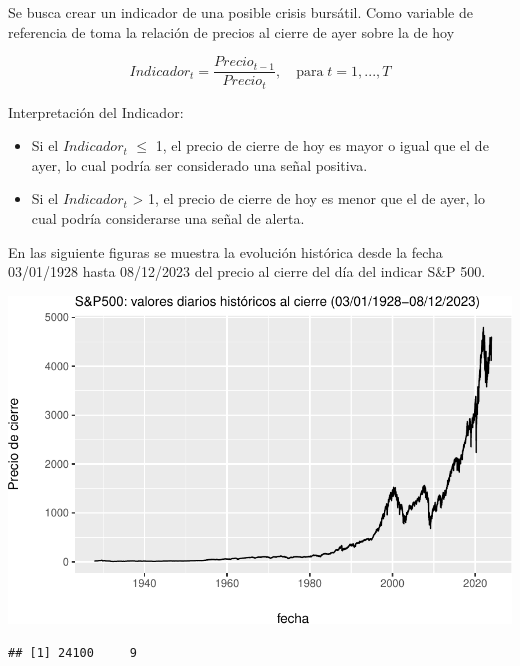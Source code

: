 \documentclass[
  oneside]{article}
\begin{document}
Se busca crear un indicador de una posible crisis bursátil. Como
variable de referencia de toma la relación de precios al cierre de ayer
sobre la de hoy

\begin{equation}
Indicador_t=\frac{Precio_{t-1}}{Precio_t},\quad\text{para}\; t=1,...,T \label{eq:ind}
\end{equation} \vspace{0.5cm}

Interpretación del Indicador:

\begin{itemize}
\item Si el $Indicador_t$    $\leq$ 1, el precio de cierre de hoy es mayor o igual que el de ayer, lo cual podría ser considerado una señal positiva.
\item Si el $Indicador_t$ > 1, el precio de cierre de hoy es menor que el de ayer, lo cual podría considerarse una señal de alerta.
\end{itemize}

\vspace{1cm}

\newpage

En las siguiente figuras se muestra la evolución histórica desde la
fecha 03/01/1928 hasta 08/12/2023 del precio al cierre del día del
indicar S\&P 500.

\includegraphics{Entrega_Laura_Montaldo_files/figure-latex/plot1-1.pdf}

\begin{verbatim}
## [1] 24100     9
\end{verbatim}
\end{document}
